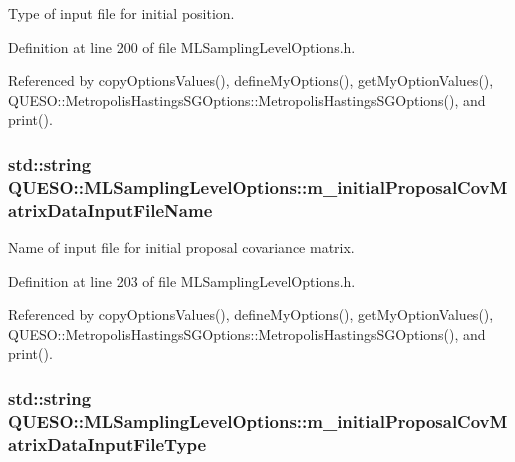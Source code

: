 Type of input file for initial position. 



Definition at line 200 of file M\-L\-Sampling\-Level\-Options.\-h.



Referenced by copy\-Options\-Values(), define\-My\-Options(), get\-My\-Option\-Values(), Q\-U\-E\-S\-O\-::\-Metropolis\-Hastings\-S\-G\-Options\-::\-Metropolis\-Hastings\-S\-G\-Options(), and print().

\hypertarget{class_q_u_e_s_o_1_1_m_l_sampling_level_options_aa2dd58cb7865577da082fde9f0b180cb}{
\subsubsection[{m\-\_\-initial\-Proposal\-Cov\-Matrix\-Data\-Input\-File\-Name}]{\setlength{\rightskip}{0pt plus 5cm}std\-::string Q\-U\-E\-S\-O\-::\-M\-L\-Sampling\-Level\-Options\-::m\-\_\-initial\-Proposal\-Cov\-Matrix\-Data\-Input\-File\-Name}}\label{class_q_u_e_s_o_1_1_m_l_sampling_level_options_aa2dd58cb7865577da082fde9f0b180cb}


Name of input file for initial proposal covariance matrix. 



Definition at line 203 of file M\-L\-Sampling\-Level\-Options.\-h.



Referenced by copy\-Options\-Values(), define\-My\-Options(), get\-My\-Option\-Values(), Q\-U\-E\-S\-O\-::\-Metropolis\-Hastings\-S\-G\-Options\-::\-Metropolis\-Hastings\-S\-G\-Options(), and print().

\hypertarget{class_q_u_e_s_o_1_1_m_l_sampling_level_options_a6e6ea2f36afd7b6a6900eaf44165a796}{
\subsubsection[{m\-\_\-initial\-Proposal\-Cov\-Matrix\-Data\-Input\-File\-Type}]{\setlength{\rightskip}{0pt plus 5cm}std\-::string Q\-U\-E\-S\-O\-::\-M\-L\-Sampling\-Level\-Options\-::m\-\_\-initial\-Proposal\-Cov\-Matrix\-Data\-Input\-File\-Type}}\label{class_q_u_e_s_o_1_1_m_l_sampling_level_options_a6e6ea2f36afd7b6a6900eaf44165a796}


